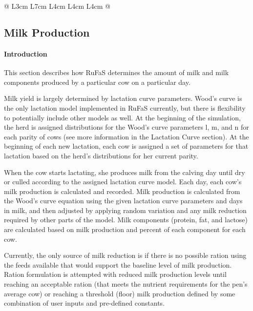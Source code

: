 \begin{refsection}
\begin{landscape}
\begin{longtable}{@{} L{3cm}  L{7cm} L{4cm} L{4cm} L{4cm}  @{}}
\end{longtable}

\vspace{0.5cm}
\end{landscape}


\subsection{Milk Production} 
 
    \paragraph{Introduction} This section describes how RuFaS determines the amount of milk and milk components produced by a particular cow on a particular day. 
    \vspace{0.25cm}
    
    Milk yield is largely determined by lactation curve parameters. Wood’s curve is the only lactation model implemented in RuFaS currently, but there is flexibility to potentially include other models as well. At the beginning of the simulation, the herd is assigned distributions for the Wood’s curve parameters l, m, and n for each parity of cows (see more information in the Lactation Curve section). At the beginning of each new lactation, each cow is assigned a set of parameters for that lactation based on the herd’s distributions for her current parity. 
    \vspace{0.25cm}
    
    When the cow starts lactating, she produces milk from the calving day until dry or culled according to the assigned lactation curve model. Each day, each cow’s milk production is calculated and recorded. Milk production is calculated from the Wood’s curve equation using the given lactation curve parameters and days in milk, and then adjusted by applying random variation and any milk reduction required by other parts of the model. Milk components (protein, fat, and lactose) are calculated based on milk production and percent of each component for each cow. 
    \vspace{0.25cm}
    
    Currently, the only source of milk reduction is if there is no possible ration using the feeds available that would support the baseline level of milk production. Ration formulation is attempted with reduced milk production levels until reaching an acceptable ration (that meets the nutrient requirements for the pen’s average cow) or reaching a threshold (floor) milk production defined by some combination of user inputs and pre-defined constants. 
    




\end{refsection}
